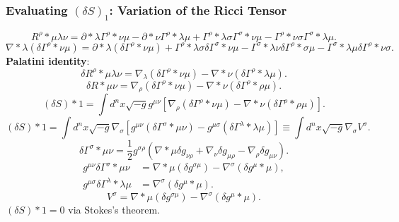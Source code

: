 \documentclass[11pt, a4paper]{report}
\begin{document}
\subsubsection*{Evaluating $(\delta S)_{1}$: Variation of the Ricci Tensor}
\begin{equation}
{R^{\rho}}*{\mu\lambda\nu} = \partial*{\lambda}\Gamma^{\rho}*{\nu\mu} - \partial*{\nu}\Gamma^{\rho}*{\lambda\mu} + \Gamma^{\rho}*{\lambda\sigma}\Gamma^{\sigma}*{\nu\mu} - \Gamma^{\rho}*{\nu\sigma}\Gamma^{\sigma}*{\lambda\mu}.
\end{equation}
\begin{equation}
\label{eq:cov_deriv_delta_gamma}
\nabla*{\lambda}(\delta\Gamma^{\rho}*{\nu\mu}) = \partial*{\lambda}(\delta\Gamma^{\rho}*{\nu\mu}) + \Gamma^{\rho}*{\lambda\sigma}\delta\Gamma^{\sigma}*{\nu\mu} - \Gamma^{\sigma}*{\lambda\nu}\delta\Gamma^{\rho}*{\sigma\mu} - \Gamma^{\sigma}*{\lambda\mu}\delta\Gamma^{\rho}*{\nu\sigma}.
\end{equation}
\textbf{Palatini identity}:
\begin{equation}
\label{eq:palatini_identity}
\delta{R^{\rho}}*{\mu\lambda\nu} = \nabla_{\lambda}(\delta\Gamma^{\rho}*{\nu\mu}) - \nabla*{\nu}(\delta\Gamma^{\rho}*{\lambda\mu}).
\end{equation}
\begin{equation}
\delta R*{\mu\nu} = \nabla_{\rho}(\delta\Gamma^{\rho}*{\nu\mu}) - \nabla*{\nu}(\delta\Gamma^{\rho}*{\rho\mu}).
\end{equation}
\begin{equation}
(\delta S)*{1} = \int d^{n}x \sqrt{-g} g^{\mu\nu} \left[ \nabla_{\rho}(\delta\Gamma^{\rho}*{\nu\mu}) - \nabla*{\nu}(\delta\Gamma^{\rho}*{\rho\mu}) \right].
\end{equation}
\begin{equation}
\label{eq:delta_s1_divergence}
(\delta S)*{1} = \int d^{n}x \sqrt{-g} \nabla_{\sigma} \left[ g^{\mu\nu}(\delta\Gamma^{\sigma}*{\mu\nu}) - g^{\mu\sigma}(\delta\Gamma^{\lambda}*{\lambda\mu}) \right] \equiv \int d^{n}x \sqrt{-g} \nabla_{\sigma} V^{\sigma}.
\end{equation}
\begin{equation}
\delta\Gamma^{\sigma}*{\mu\nu} = \frac{1}{2} g^{\sigma\rho} \left( \nabla*{\mu}\delta g_{\nu\rho} + \nabla_{\nu}\delta g_{\mu\rho} - \nabla_{\rho}\delta g_{\mu\nu} \right).
\end{equation}
\begin{align}
g^{\mu\nu}\delta\Gamma^{\sigma}*{\mu\nu} &= \nabla*{\mu}(\delta g^{\sigma\mu}) - \nabla^{\sigma}(\delta g^{\mu}*{\mu}), \\
g^{\mu\sigma}\delta\Gamma^{\lambda}*{\lambda\mu} &= \nabla^{\sigma}(\delta g^{\mu}*{\mu}).
\end{align}
\begin{equation}
V^{\sigma} = \nabla*{\mu}(\delta g^{\sigma\mu}) - \nabla^{\sigma}(\delta g^{\mu}*{\mu}).
\end{equation}
$(\delta S)*{1} = 0$ via Stokes's theorem.
\end{document}
